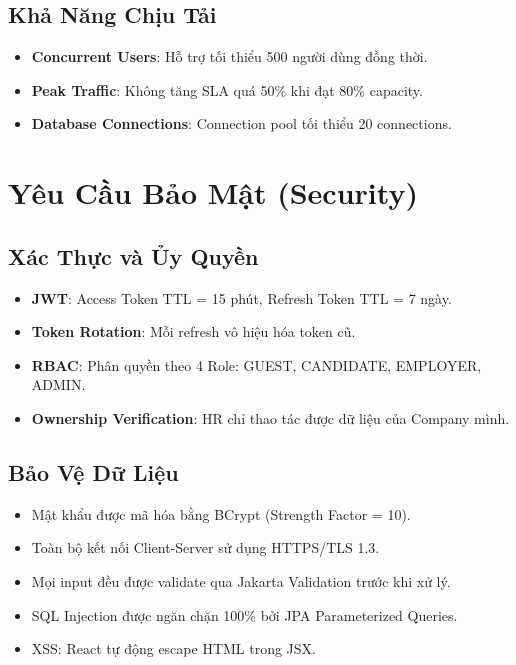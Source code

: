 \documentclass[12pt, a4paper]{report}
\begin{document}
\subsection{Khả Năng Chịu Tải}

\begin{itemize}
    \item \textbf{Concurrent Users}: Hỗ trợ tối thiểu 500 người dùng đồng thời.
    \item \textbf{Peak Traffic}: Không tăng SLA quá 50\% khi đạt 80\% capacity.
    \item \textbf{Database Connections}: Connection pool tối thiểu 20 connections.
\end{itemize}

\section{Yêu Cầu Bảo Mật (Security)}

\subsection{Xác Thực và Ủy Quyền}

\begin{itemize}
    \item \textbf{JWT}: Access Token TTL = 15 phút, Refresh Token TTL = 7 ngày.
    \item \textbf{Token Rotation}: Mỗi refresh vô hiệu hóa token cũ.
    \item \textbf{RBAC}: Phân quyền theo 4 Role: GUEST, CANDIDATE, EMPLOYER, ADMIN.
    \item \textbf{Ownership Verification}: HR chỉ thao tác được dữ liệu của Company mình.
\end{itemize}

\subsection{Bảo Vệ Dữ Liệu}

\begin{itemize}
    \item Mật khẩu được mã hóa bằng BCrypt (Strength Factor = 10).
    \item Toàn bộ kết nối Client-Server sử dụng HTTPS/TLS 1.3.
    \item Mọi input đều được validate qua Jakarta Validation trước khi xử lý.
    \item SQL Injection được ngăn chặn 100\% bởi JPA Parameterized Queries.
    \item XSS: React tự động escape HTML trong JSX.
\end{itemize}
\end{document}
